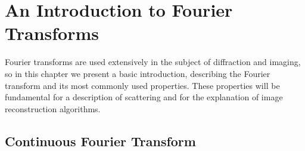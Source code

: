 \chapter{An Introduction to Fourier Transforms}\label{fourier_transform_basics}\noindent
Fourier transforms are used extensively in the subject of diffraction and
imaging, so in this chapter we present a basic introduction, describing the
Fourier transform and its most commonly used properties. These properties will
be fundamental for a description of scattering and for the explanation
of image reconstruction algorithms.

\section{Continuous Fourier Transform}

